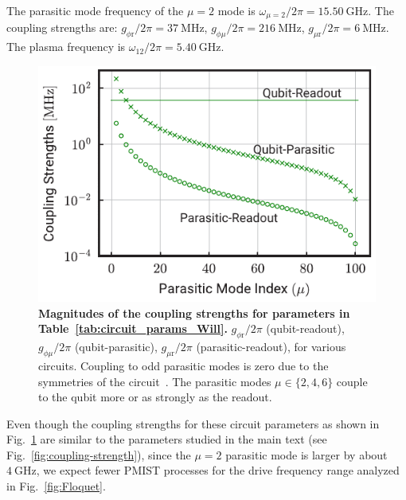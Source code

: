 \documentclass[%
reprint,
superscriptaddress,
 amsmath,amssymb,
 aps,
 prx,
longbibliography,
floatfix,
]{revtex4-2}
\begin{document}
The parasitic mode frequency of the $\mu=2$ mode is $\omega_{\mu=2}/2\pi=15.50 \ \mathrm{GHz}$. The coupling strengths are: $g_{\phi \textrm{r}}/2\pi=37 \ \mathrm{MHz}$, $g_{\phi\mu}/2\pi=216 \ \mathrm{MHz}$, $g_{\mu \textrm{r}}/2\pi=6 \ \mathrm{MHz}$. The plasma frequency is $\omega_{12}/2\pi=5.40 \ \mathrm{GHz}$. 
\begin{figure}[htb]
    \centering
    \includegraphics[width=\linewidth]{Supp_Fig/Coupling-Will.pdf}
    \caption{{\bf Magnitudes of the coupling strengths for parameters in Table~\ref{tab:circuit_params_Will}.} $g_{\phi \textrm{r}}/2\pi$ (qubit-readout), $g_{\phi\mu}/2\pi$ (qubit-parasitic), $g_{\mu \textrm{r}}/2\pi$ (parasitic-readout), for various circuits. Coupling to odd parasitic modes is zero due to the symmetries of the circuit~\cite{viola2015collective}. The parasitic modes $\mu\in\{2,4,6\}$ couple to the qubit more or as strongly as the readout.}
    \label{fig:coupling-strength-Will}
\end{figure}
Even though the coupling strengths for these circuit parameters as shown in Fig.~\ref{fig:coupling-strength-Will} are similar to the parameters studied in the main text (see Fig.~\ref{fig:coupling-strength}), since the $\mu=2$ parasitic mode is larger by about $4 \ \mathrm{GHz}$, we expect fewer PMIST processes for the drive frequency range analyzed in Fig.~\ref{fig:Floquet}.
\end{document}
